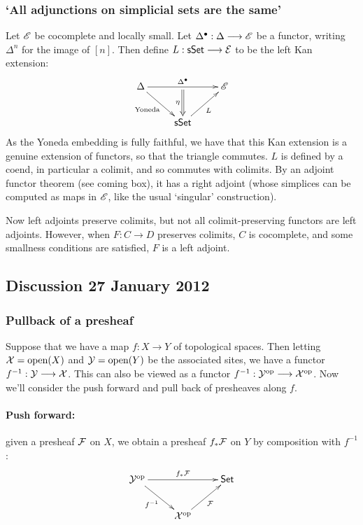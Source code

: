 \documentclass[11pt]{article}
\begin{document}
\begin{1. Kan Extensions}
\subsubsection*{`All adjunctions on simplicial sets are the same'}
Let $\mathscr{E}$ be cocomplete and locally small. Let $\Delta^\bullet:\Delta\longrightarrow\mathscr{E}$ be a functor, writing $\Delta^n$ for the image of $[n]$. Then define $L:\operatorname{{\mathsf{sSet}}}\longrightarrow\mathcal{E}$ to be the left Kan extension:
\[\xymatrix{
\Delta\ar[rd]_-{\textup{Yoneda}} 
\ar[rr]^-{\Delta^\bullet}_-{}="arF"&%
&%
\scrE\\%
&%
\sSet\ar@{->}[ur]_{L}\ar@{=>}"arF";[]_-{\eta}&%
}\]
As the Yoneda embedding is fully faithful, we have that this Kan extension is a genuine extension of functors, so that the triangle commutes. $L$ is defined by a coend, in particular a colimit, and so commutes with colimits. By an adjoint functor theorem (see coming box), it has a right adjoint (whose simplices can be computed as maps in $\mathscr{E}$, like the usual `singular' construction).
\begin{shaded}
Now left adjoints preserve colimits, but not all colimit-preserving functors are left adjoints. However, when $F:C\to D$ preserves colimits, $C$ is cocomplete, and some smallness conditions are satisfied, $F$ is a left adjoint.
\end{shaded}




\begin{shaded}
\subsection*{Discussion 27 January 2012}

\subsubsection*{Pullback of a presheaf}
 Suppose that we have a map $f:X\to Y$ of topological spaces. Then letting $\mathcal{X}=\textup{open}(X)$ and $\mathcal{Y}=\textup{open}(Y)$ be the associated sites, we have a functor $f^{-1}:\mathcal{Y}\longrightarrow\mathcal{X}$. This can also be viewed as a functor $f^{-1}:\mathcal{Y}^{\textup{op}}\longrightarrow\mathcal{X}^{\textup{op}}$. Now we'll consider the push forward and pull back of presheaves along $f$.

\paragraph*{Push forward:} given a presheaf $\mathcal{F}$ on $X$, we obtain a presheaf $f_*\mathcal{F}$ on $Y$ by composition with $f^{-1}$:
\[\vcenter{\xymatrix{
\calY^\op\ar[rd]_-{f^{-1}} \ar[rr]^-{f_*\calF}_-{}="arF"&%
&%
\Set\\%
&%
\calX^\op\ar@{->}[ur]_{\calF}%
}}
\]


\end{shaded}
\end{1. Kan Extensions}
\end{document}
